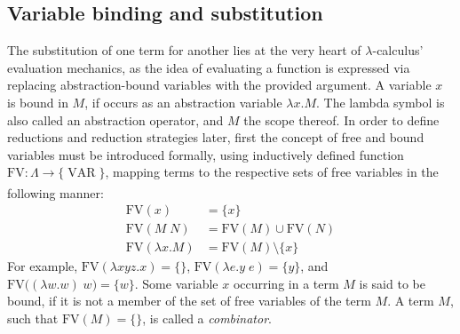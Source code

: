 \documentclass[table, a4paper, 10pt]{book}
\newcommand{\cit}[1]{\textsuperscript{\cite{#1}}}
\begin{document}
\subsection{Variable binding and substitution}\label{sec:subst}
The substitution of one term for another lies at the very heart of $\lambda$-calculus'
evaluation mechanics, as the idea of evaluating a function is expressed via replacing
abstraction-bound variables with the provided argument. A variable $x$ is bound in $M$,
if occurs as an abstraction variable $\lambda x.M$. The lambda symbol is also called
an abstraction operator, and $M$ the scope thereof. In order to define
reductions and reduction strategies later, first the concept of free
and bound variables must be introduced formally, using inductively defined
function $\mathrm{FV} : \Lambda \to \big\{\mathrm{\;VAR\;}\big\}$, mapping 
terms to the respective sets of free variables in the following manner:\cit{zlatuska}
\begin{align*}
	\mathrm{FV}(x) &= \{x\} \\
    \mathrm{FV}(M\;N) &= \mathrm{FV}(M) \cup \mathrm{FV}(N)\\
	\mathrm{FV}(\lambda x.M) &= \mathrm{FV}(M) \setminus \{x\}
\end{align*}
For example, $\mathrm{FV}(\lambda x y z.x) = \{\}$, $\mathrm{FV}(\lambda e.y\;e) = \{y\}$,
and $\mathrm{FV}\big((\lambda w.w)\;w\big) = \{w\}$. Some variable $x$ occurring in a term $M$ is
said to be bound, if it is not a member of the set of free variables of the term $M$.
A term $M$, such that $\mathrm{FV}(M) = \{\}$, is called a \textit{combinator}.
\end{document}
